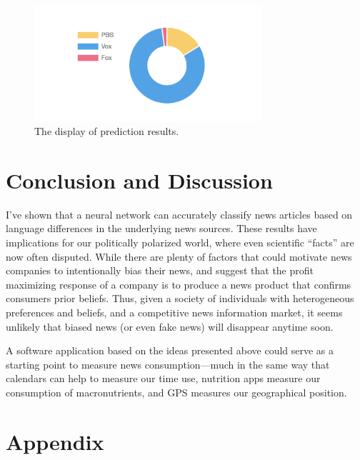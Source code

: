 \documentclass{article}
\begin{document}
	\begin{figure}[H]
		\centering
		\includegraphics[width=0.75\textwidth]{figures/images/web-results.png}
		\caption{The display of prediction results.}
		\label{fig:results}
	\end{figure}

		
	\section{Conclusion and Discussion}
	I've shown that a neural network can accurately classify news articles based on language differences in the underlying news sources. These results have implications for our politically polarized world, where even scientific ``facts'' are now often disputed. While there are plenty of factors that could motivate news companies to intentionally bias their news,  \citet{gentzkow2008competition} and \citet{gentzkow2006media} suggest that the profit maximizing response of a company is to produce a news product that confirms consumers prior beliefs. Thus, given a society of individuals with heterogeneous preferences and beliefs, and a competitive news information market, it seems unlikely that biased news (or even fake news) will disappear anytime soon. 
	
	A software application based on the ideas presented above could serve as a starting point to measure news consumption---much in the same way that calendars can help to measure our time use, nutrition apps measure our consumption of macronutrients, and GPS measures our geographical position. 
	
	\newpage
	
	
	
	
	
	\newpage
	
	
	\section{Appendix}
	
	\begin{center}
		
		
		
		
		
		
		
	\end{center}
	
\end{document}
